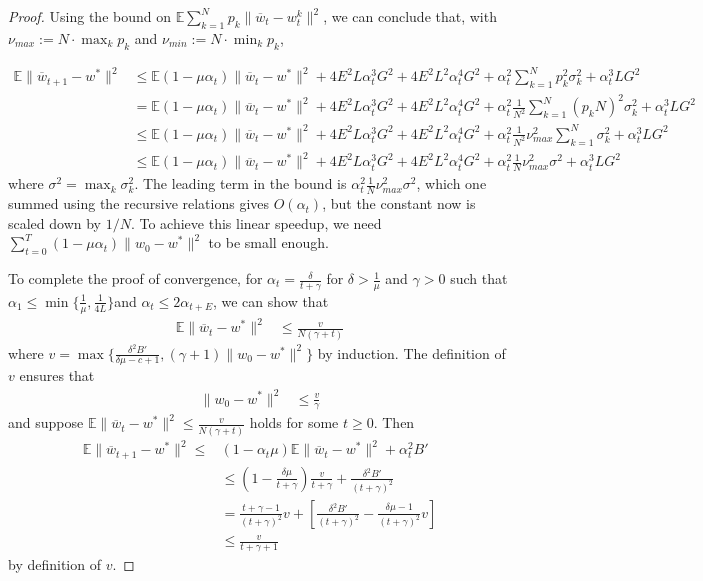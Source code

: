 \begin{proof}
Using the bound on $\mathbb{E}\sum_{k=1}^{N}p_{k}\|\overline{w}_{t}-w_{t}^{k}\|^{2}$,
we can conclude that, with $\nu_{max}:=N\cdot\max_{k}p_{k}$ and $\nu_{min}:=N\cdot\min_{k}p_{k}$, 

\begin{align*}
\mathbb{E}\|\overline{w}_{t+1}-w^{\ast}\|^{2} & \leq\mathbb{E}(1-\mu\alpha_{t})\|\overline{w}_{t}-w^{\ast}\|^{2}+4E^{2}L\alpha_{t}^{3}G^{2}+4E^{2}L^{2}\alpha_{t}^{4}G^{2}+\alpha_{t}^{2}\sum_{k=1}^{N}p_{k}^{2}\sigma_{k}^{2}+\alpha_{t}^{3}LG^{2}\\
 & =\mathbb{E}(1-\mu\alpha_{t})\|\overline{w}_{t}-w^{\ast}\|^{2}+4E^{2}L\alpha_{t}^{3}G^{2}+4E^{2}L^{2}\alpha_{t}^{4}G^{2}+\alpha_{t}^{2}\frac{1}{N^{2}}\sum_{k=1}^{N}(p_{k}N)^{2}\sigma_{k}^{2}+\alpha_{t}^{3}LG^{2}\\
 & \leq\mathbb{E}(1-\mu\alpha_{t})\|\overline{w}_{t}-w^{\ast}\|^{2}+4E^{2}L\alpha_{t}^{3}G^{2}+4E^{2}L^{2}\alpha_{t}^{4}G^{2}+\alpha_{t}^{2}\frac{1}{N^{2}}\nu_{max}^{2}\sum_{k=1}^{N}\sigma_{k}^{2}+\alpha_{t}^{3}LG^{2}\\
 & \leq\mathbb{E}(1-\mu\alpha_{t})\|\overline{w}_{t}-w^{\ast}\|^{2}+4E^{2}L\alpha_{t}^{3}G^{2}+4E^{2}L^{2}\alpha_{t}^{4}G^{2}+\alpha_{t}^{2}\frac{1}{N}\nu_{max}^{2}\sigma^{2}+\alpha_{t}^{3}LG^{2}
\end{align*}
 where $\sigma^{2}=\max_{k}\sigma_{k}^{2}$. The leading term in the
bound is $\alpha_{t}^{2}\frac{1}{N}\nu_{max}^{2}\sigma^{2}$, which
one summed using the recursive relations gives $O(\alpha_{t})$, but
the constant now is scaled down by $1/N$. To achieve this linear
speedup, we need $\sum_{t=0}^{T}(1-\mu\alpha_{t})\|w_{0}-w^{\ast}\|^{2}$
to be small enough. 

To complete the proof of convergence, for $\alpha_{t}=\frac{\delta}{t+\gamma}$
for $\delta>\frac{1}{\mu}$ and $\gamma>0$ such that $\alpha_{1}\leq\min\{\frac{1}{\mu},\frac{1}{4L}\}$and
$\alpha_{t}\leq2\alpha_{t+E}$, we can show that 
\begin{align*}
\mathbb{E}\|\overline{w}_{t}-w^{\ast}\|^{2} & \leq\frac{v}{N(\gamma+t)}
\end{align*}
 where $v=\max\{\frac{\delta^{2}B'}{\delta\mu-c+1},(\gamma+1)\|w_{0}-w^{\ast}\|^{2}\}$
by induction. The definition of $v$ ensures that 
\begin{align*}
\|w_{0}-w^{\ast}\|^{2} & \leq\frac{v}{\gamma}
\end{align*}
 and suppose $\mathbb{E}\|\overline{w}_{t}-w^{\ast}\|^{2}\leq\frac{v}{N(\gamma+t)}$
holds for some $t\geq0$. Then 
\begin{align*}
\mathbb{E}\|\overline{w}_{t+1}-w^{\ast}\|^{2}\leq & (1-\alpha_{t}\mu)\mathbb{E}\|\overline{w}_{t}-w^{\ast}\|^{2}+\alpha_{t}^{2}B'\\
 & \leq(1-\frac{\delta\mu}{t+\gamma})\frac{v}{t+\gamma}+\frac{\delta^{2}B'}{(t+\gamma)^{2}}\\
 & =\frac{t+\gamma-1}{(t+\gamma)^{2}}v+\left[\frac{\delta^{2}B'}{(t+\gamma)^{2}}-\frac{\delta\mu-1}{(t+\gamma)^{2}}v\right]\\
 & \leq\frac{v}{t+\gamma+1}
\end{align*}
 by definition of $v$.


\end{proof}

